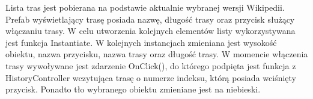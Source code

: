 Lista tras jest pobierana na podstawie aktualnie wybranej wersji Wikipedii. Prefab wyświetlający trasę posiada nazwę, długość trasy oraz przycisk służący włączaniu trasy. W celu utworzenia kolejnych elementów listy wykorzystywana jest funkcja Instantiate. W kolejnych instancjach zmieniana jest wysokość obiektu, nazwa przycisku, nazwa trasy oraz długość trasy.  W momencie włączenia trasy wywoływane jest zdarzenie OnClick(), do którego podpięta jest funkcja z HistoryController wczytująca trasę o numerze indeksu, którą posiada wciśnięty przycisk. Ponadto tło wybranego obiektu zmieniane jest na niebieski.
